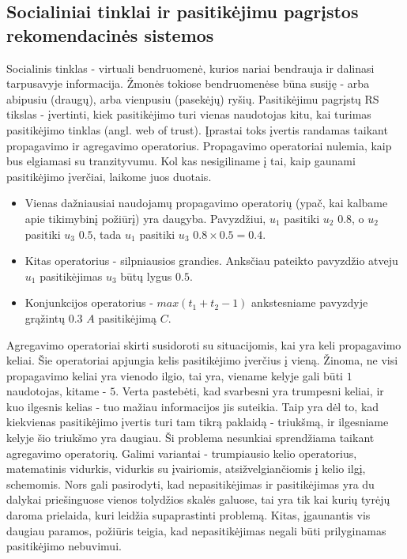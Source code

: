 \documentclass{VUMIFInfMagistrinis}
\begin{document}
\subsection{Socialiniai tinklai ir pasitikėjimu pagrįstos rekomendacinės sistemos}
Socialinis tinklas - virtuali bendruomenė, kurios nariai bendrauja ir dalinasi tarpusavyje informacija. Žmonės tokiose bendruomenėse būna susiję - arba abipusiu (draugų), arba vienpusiu (pasekėjų) ryšių.
Pasitikėjimu pagrįstų RS tikslas - įvertinti, kiek pasitikėjimo turi vienas naudotojas kitu, kai turimas pasitikėjimo tinklas (angl. web of trust). Įprastai toks įvertis randamas taikant propagavimo ir agregavimo operatorius. Propagavimo operatoriai nulemia, kaip bus elgiamasi su tranzityvumu. Kol kas nesigiliname į tai, kaip gaunami pasitikėjimo įverčiai, laikome juos duotais. 
\indent
\begin{itemize}
	\item Vienas dažniausiai naudojamų propagavimo operatorių (ypač, kai kalbame apie tikimybinį požiūrį) yra daugyba. Pavyzdžiui, $u_1$ pasitiki $u_2$ $0.8$, o $u_2$ pasitiki $u_3$ $0.5$, tada $u_1$ pasitiki $u_3$ $0.8 \times 0.5 = 0.4$. 
	\item Kitas operatorius - silpniausios grandies. Anksčiau pateikto pavyzdžio atveju $u_1$ pasitikėjimas $u_3$ būtų lygus $0.5$. 
	\item Konjunkcijos operatorius - $max(t_1+t_2-1)$ ankstesniame pavyzdyje grąžintų $0.3$ $A$ pasitikėjimą $C$.
\end{itemize}
Agregavimo operatoriai skirti susidoroti su situacijomis, kai yra keli propagavimo keliai. Šie operatoriai apjungia kelis pasitikėjimo įverčius į vieną. Žinoma, ne visi propagavimo keliai yra vienodo ilgio, tai yra, viename kelyje gali būti $1$ naudotojas, kitame - $5$. Verta pastebėti, kad svarbesni yra trumpesni keliai, ir kuo ilgesnis kelias - tuo mažiau informacijos jis suteikia. Taip yra dėl to, kad kiekvienas pasitikėjimo įvertis turi tam tikrą paklaidą - triukšmą, ir ilgesniame kelyje šio triukšmo yra daugiau. Ši problema nesunkiai sprendžiama taikant agregavimo operatorių. Galimi variantai - trumpiausio kelio operatorius, matematinis vidurkis, vidurkis su įvairiomis, atsižvelgiančiomis į kelio ilgį, schemomis.
\newline
\indent
Nors gali pasirodyti, kad nepasitikėjimas ir pasitikėjimas yra du dalykai priešinguose vienos tolydžios skalės galuose, tai yra tik kai kurių tyrėjų daroma prielaida, kuri leidžia supaprastinti problemą. Kitas, įgaunantis vis daugiau paramos, požiūris teigia, kad nepasitikėjimas negali būti prilyginamas pasitikėjimo nebuvimui.
\end{document}
